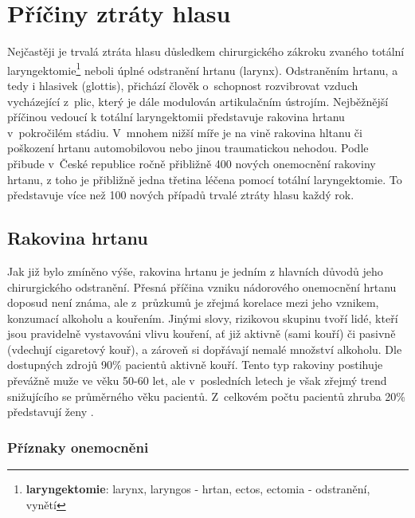 \section{Příčiny ztráty hlasu}
\label{chap:cause:desease}

Nejčastěji je trvalá ztráta hlasu důsledkem chirurgického zákroku zvaného
totální laryngektomie\footnote{\textbf{laryngektomie}: larynx, laryngos -
hrtan, ectos, ectomia - odstranění, vynětí} neboli úplné odstranění hrtanu (larynx).
Odstraněním hrtanu, a tedy i hlasivek (glottis), přichází člověk o~schopnost
rozvibrovat vzduch vycházející z~plic, který je dále modulován artikulačním
ústrojím. Nejběžnější příčinou vedoucí k totální laryngektomii představuje
rakovina hrtanu v~pokročilém stádiu. V~mnohem nižší míře je na vině rakovina
hltanu či poškození hrtanu automobilovou nebo jinou traumatickou nehodou.
Podle \cite{Slavicek2000} přibude v~České republice ročně přibližně 400 nových
onemocnění rakoviny hrtanu, z toho je přibližně jedna třetina léčena pomocí
totální laryngektomie. To představuje více než 100 nových případů trvalé
ztráty hlasu každý rok.

\subsection{Rakovina hrtanu} %
\label{chap:cause:desease:cancer}

Jak již bylo zmíněno výše, rakovina hrtanu je jedním z hlavních důvodů jeho chirurgického odstranění.
Přesná příčina vzniku nádorového onemocnění hrtanu doposud není známa, ale
z~průzkumů je zřejmá korelace mezi jeho vznikem, konzumací alkoholu a
kouřením. Jinými slovy, rizikovou skupinu tvoří lidé, kteří jsou
pravidelně vystavováni vlivu kouření, ať již aktivně (sami kouří) či pasivně
(vdechují cigaretový kouř), a zároveň si dopřávají nemalé množství alkoholu.
Dle dostupných zdrojů %
90\% pacientů aktivně kouří.
Tento typ rakoviny postihuje převážně muže ve věku 50-60 let,
ale v~posledních letech je však zřejmý trend snižujícího se průměrného věku
pacientů. Z~celkovém počtu pacientů zhruba 20\%
představují ženy \cite{Skvrnakova2010}.



\subsubsection{Příznaky onemocněni} %
\label{chap:cause:desease:cancer:symptom}

